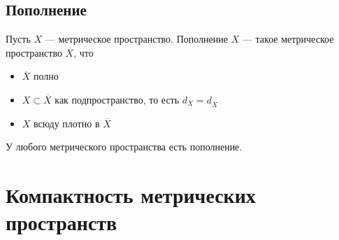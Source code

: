 \documentclass[11pt]{book}
\theoremstyle{definition}
\theoremstyle{plain}
\theoremstyle{plain}
\theoremstyle{definition}
\theoremstyle{remark}
\begin{document}
\subsection{Пополнение}
\begin{defn}
    Пусть $ X$ --- метрическое пространство. Пополнение  $ X$ --- такое метрическое пространство  $ \overline{X}$, что
    \begin{itemize}
	\item $ \overline{X}$ полно
	\item $ X \subset \overline{X}$ как подпространство, то есть $ d_X = d_{\overline{X}}$
	\item $ X$ всюду плотно в  $ \overline{X}$
    \end{itemize}
\end{defn}
\begin{thm}
    У любого метрического пространства есть пополнение.
\end{thm}
\section{Компактность метрических пространств}
\end{document}
